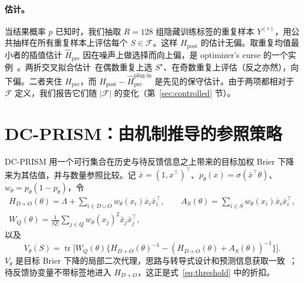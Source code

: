 \documentclass[runningheads]{llncs}
\begin{document}
\paragraph{估计。}当结果概率 $p$ 已知时，我们抽取 $R=128$ 组隐藏训练标签的重复样本 $Y^{(r)}$，用公共抽样在所有重复样本上评估每个 $S\in\mathcal F$。这样 $H_{\mathrm{post}}$ 的估计无偏。取重复均值最小者的插值估计 $\widehat H_{\mathrm{pre}}$ 因在噪声上做选择而向上偏，是 optimizer's curse 的一个实例~\cite{smith2006optimizer,cawley2010overfitting}。两折交叉拟合估计~\cite{chernozhukov2018double}在偶数重复上选 $S^\star$、在奇数重复上评估（反之亦然），向下偏。二者夹住 $H_{\mathrm{pre}}$，而 $H_{\mathrm{post}}-\widehat H_{\mathrm{pre}}^{\text{plug-in}}$ 是先见的保守估计。由于两项都相对于 $\mathcal F$ 定义，我们报告它们随 $|\mathcal F|$ 的变化（第~\ref{sec:controlled} 节）。

\section{DC-PRISM：由机制推导的参照策略}
\label{sec:policy}
DC-PRISM 用一个可行集合在历史与待反馈信息之上带来的目标加权 Brier 下降来为其估值，并与数量参照比较。记 $\bar x=(1,x^\top)^\top$、$p_\theta(x)=\sigma(\bar x^\top\theta)$、$w_\theta=p_\theta(1-p_\theta)$，令
\begin{gather*}
 H_{D+O}(\theta)=\Lambda+\!\!\sum_{i\in D\cup O}\!\!w_\theta(x_i)\bar x_i\bar x_i^\top,\qquad
 A_S(\theta)=\sum_{i\in S}w_\theta(x_i)\bar x_i\bar x_i^\top,\\
 W_Q(\theta)=\tfrac1{|Q|}\sum_{j\in Q}w_\theta(x_j)^2\bar x_j\bar x_j^\top,
\end{gather*}
以及
\begin{equation}
 V_\theta(S)=\operatorname{tr}\!\big[W_Q(\theta)\{H_{D+O}(\theta)^{-1}-(H_{D+O}(\theta)+A_S(\theta))^{-1}\}\big].\label{eq:value}
\end{equation}
$V_\theta$ 是目标 Brier 下降的局部二次代理，思路与转导式设计和预测信息获取一致~\cite{yu2006transductive,bickfordsmith2023prediction}；待反馈协变量不带标签地进入 $H_{D+O}$，这正是式~\eqref{eq:threshold} 中的折扣。
\end{document}
